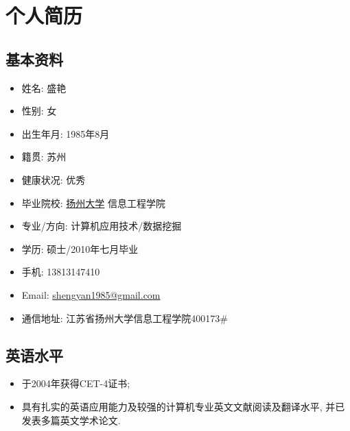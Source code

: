 \documentclass[a4paper,10pt,english]{manual}
\begin{document}

\chapter{个人简历}
\section{基本资料}
\begin{itemize}
\item {} 
姓名: 盛艳

\item {} 
性别: 女

\item {} 
出生年月: 1985年8月

\item {} 
籍贯: 苏州

\item {} 
健康状况: 优秀

\item {} 
毕业院校: \href{http://www.yzu.edu.cn}{扬州大学} 信息工程学院

\item {} 
专业/方向: 计算机应用技术/数据挖掘

\item {} 
学历: 硕士/2010年七月毕业

\item {} 
手机: 13813147410

\item {} 
Email: \href{mailto:shengyan1985@gmail.com}{shengyan1985@gmail.com}

\item {} 
通信地址: 江苏省扬州大学信息工程学院400173\#

\end{itemize}

\section{英语水平}
\begin{itemize}
\item {} 
于2004年获得CET-4证书;

\item {} 
具有扎实的英语应用能力及较强的计算机专业英文文献阅读及翻译水平, 并已发表多篇英文学术论文.

\end{itemize}
\end{document}
